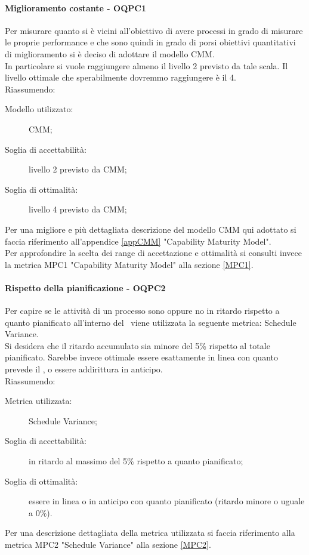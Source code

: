 \documentclass[../PianoDiQualifica.tex]{subfiles}
\begin{document}
		\paragraph{Miglioramento costante - OQPC1}
		Per misurare quanto si è vicini all’obiettivo di avere processi in grado di misurare le proprie performance e che sono quindi in grado di porsi obiettivi quantitativi di miglioramento si è deciso di adottare il modello CMM.\\
		In particolare si vuole raggiungere almeno il livello 2 previsto da tale scala. Il livello ottimale che sperabilmente dovremmo raggiungere è il 4.\\
		Riassumendo:
		\begin{description}
			\item[Modello utilizzato:] CMM;
			\item[Soglia di accettabilità:] livello 2 previsto da CMM;
			\item[Soglia di ottimalità:] livello 4 previsto da CMM;
		\end{description}
		Per una migliore e più dettagliata descrizione del modello CMM qui adottato si faccia riferimento all'appendice \ref{appCMM} "Capability Maturity Model".\\
		Per approfondire la scelta dei range di accettazione e ottimalità si consulti invece la metrica MPC1 "Capability Maturity Model" alla sezione \ref{MPC1}.
		
		\paragraph{Rispetto della pianificazione - OQPC2}
		Per capire se le attività di un processo sono oppure no in ritardo rispetto a quanto pianificato all’interno del \pianodiprogetto\ viene utilizzata la seguente metrica: Schedule Variance.\\
		Si desidera che il ritardo accumulato sia minore del 5\% rispetto al totale pianificato. Sarebbe invece ottimale essere esattamente in linea con quanto prevede il \pianodiprogetto, o essere addirittura in anticipo.\\
		Riassumendo:
		\begin{description}
			\item[Metrica utilizzata:] Schedule Variance;
			\item[Soglia di accettabilità:] in ritardo al massimo del 5\% rispetto a quanto pianificato;
			\item[Soglia di ottimalità:] essere in linea o in anticipo con quanto pianificato (ritardo minore o uguale a 0\%).
		\end{description}
		Per una descrizione dettagliata della metrica utilizzata si faccia riferimento alla metrica MPC2 "Schedule Variance" alla sezione \ref{MPC2}.
		
\end{document}
